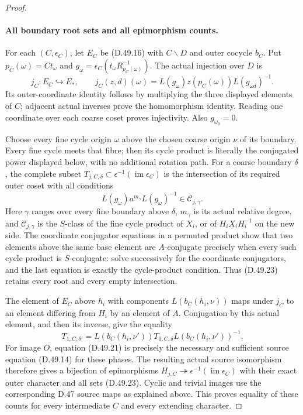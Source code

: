 \begin{proof}
\paragraph{All boundary root sets and all epimorphism counts.}
For each \((C,\epsilon_C)\), let \(E_C\) be
\textup{(D.49.16)} with \(C\backslash D\) and outer cocycle \(b_C\).
Put \(p_C(\omega)=Ct_\omega\) and
\(g_\omega=\epsilon_C(t_\omega R_{p_C(\omega)}^{-1})\).
The actual injection over \(D\) is
\[
 j_C:E_C\hookrightarrow E_*,\qquad
 j_C(z,d)(\omega)
    =L(g_\omega)z(p_C(\omega))L(g_{\omega d})^{-1}.
 \tag{D.49.22}
\]
Its outer-coordinate identity follows by multiplying the three
displayed elements of \(C\); adjacent actual inverses prove the
homomorphism identity. Reading one coordinate over each coarse
coset proves injectivity. Also \(g_{\omega_0}=0\).

Choose every fine cycle origin \(\omega\) above the chosen coarse
origin \(\nu\) of its boundary. Every fine cycle meets that fibre;
then its cycle product is literally the conjugated power displayed
below, with no additional rotation path.
For a coarse boundary \(\delta\), the complete subset
\(T_{j,C,\delta}\subset\epsilon^{-1}(\operatorname{im}\epsilon_C)\)
is the intersection of its required outer coset with all conditions
\[
       L(g_\omega)a^{m_\gamma}L(g_\omega)^{-1}
                       \in\mathcal C_{j,\gamma}.
 \tag{D.49.23}
\]
Here \(\gamma\) ranges over every fine boundary above \(\delta\),
\(m_\gamma\) is its actual relative degree, and
\(\mathcal C_{j,\gamma}\) is the \(S\)-class of the fine cycle
product of \(X_i\), or of \(H_iX_iH_i^{-1}\) on the new side.
The coordinate conjugator equations in a permuted product show that
two elements above the same base element are \(A\)-conjugate
precisely when every such cycle product is \(S\)-conjugate:
solve successively for the coordinate conjugators, and the last
equation is exactly the cycle-product condition.
Thus \textup{(D.49.23)} retains every root and every empty
intersection.

The element of \(E_C\) above \(h_i\) with components
\(L(b_C(h_i,\nu))\) maps under \(j_C\) to an element differing
from \(H_i\) by an element of \(A\). Conjugation by this actual
element, and then its inverse, give the equality
\[
 T_{1,C,\delta'}=
 L(b_C(h_i,\nu'))T_{0,C,\delta}L(b_C(h_i,\nu'))^{-1}.
 \tag{D.49.24}
\]
For image \(O\), equation \textup{(D.49.21)} is precisely the
necessary and sufficient source equation \textup{(D.49.14)} for
these phases. The resulting actual source isomorphism therefore
gives a bijection of epimorphisms
\(H_{j,C}\twoheadrightarrow\epsilon^{-1}(\operatorname{im}\epsilon_C)\)
with their exact outer character and all sets
\textup{(D.49.23)}. Cyclic and trivial images use the corresponding
D.47 source maps as explained above. This proves equality of these
counts for every intermediate \(C\) and every extending character.


\end{proof}
